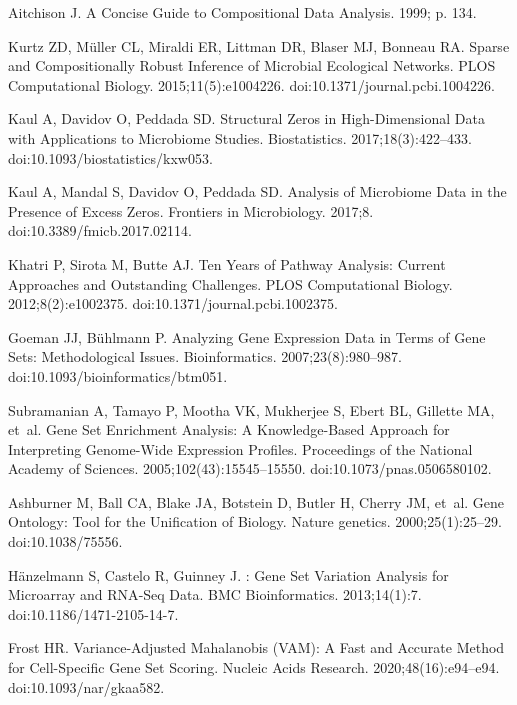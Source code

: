 \documentclass[10pt,letterpaper]{article}
\begin{document}
\begin{thebibliography}{10}
Aitchison J.
\newblock A {{Concise Guide}} to {{Compositional Data Analysis}}. 1999; p. 134.

Kurtz ZD, M{\"u}ller CL, Miraldi ER, Littman DR, Blaser MJ, Bonneau RA.
\newblock Sparse and {{Compositionally Robust Inference}} of {{Microbial
  Ecological Networks}}.
\newblock PLOS Computational Biology. 2015;11(5):e1004226.
\newblock doi:{10.1371/journal.pcbi.1004226}.

Kaul A, Davidov O, Peddada SD.
\newblock Structural Zeros in High-Dimensional Data with Applications to
  Microbiome Studies.
\newblock Biostatistics. 2017;18(3):422--433.
\newblock doi:{10.1093/biostatistics/kxw053}.

Kaul A, Mandal S, Davidov O, Peddada SD.
\newblock Analysis of {{Microbiome Data}} in the {{Presence}} of {{Excess
  Zeros}}.
\newblock Frontiers in Microbiology. 2017;8.
\newblock doi:{10.3389/fmicb.2017.02114}.

Khatri P, Sirota M, Butte AJ.
\newblock Ten {{Years}} of {{Pathway Analysis}}: {{Current Approaches}} and
  {{Outstanding Challenges}}.
\newblock PLOS Computational Biology. 2012;8(2):e1002375.
\newblock doi:{10.1371/journal.pcbi.1002375}.

Goeman JJ, B{\"u}hlmann P.
\newblock Analyzing Gene Expression Data in Terms of Gene Sets: Methodological
  Issues.
\newblock Bioinformatics. 2007;23(8):980--987.
\newblock doi:{10.1093/bioinformatics/btm051}.

Subramanian A, Tamayo P, Mootha VK, Mukherjee S, Ebert BL, Gillette MA, et~al.
\newblock Gene Set Enrichment Analysis: {{A}} Knowledge-Based Approach for
  Interpreting Genome-Wide Expression Profiles.
\newblock Proceedings of the National Academy of Sciences.
  2005;102(43):15545--15550.
\newblock doi:{10.1073/pnas.0506580102}.

Ashburner M, Ball CA, Blake JA, Botstein D, Butler H, Cherry JM, et~al.
\newblock Gene {{Ontology}}: Tool for the Unification of Biology.
\newblock Nature genetics. 2000;25(1):25--29.
\newblock doi:{10.1038/75556}.

H{\"a}nzelmann S, Castelo R, Guinney J.
: Gene Set Variation Analysis for Microarray and
  {{RNA}}-{{Seq}} Data.
\newblock BMC Bioinformatics. 2013;14(1):7.
\newblock doi:{10.1186/1471-2105-14-7}.

Frost HR.
\newblock Variance-Adjusted {{Mahalanobis}} ({{VAM}}): A Fast and Accurate
  Method for Cell-Specific Gene Set Scoring.
\newblock Nucleic Acids Research. 2020;48(16):e94--e94.
\newblock doi:{10.1093/nar/gkaa582}.


\end{thebibliography}
\end{document}
